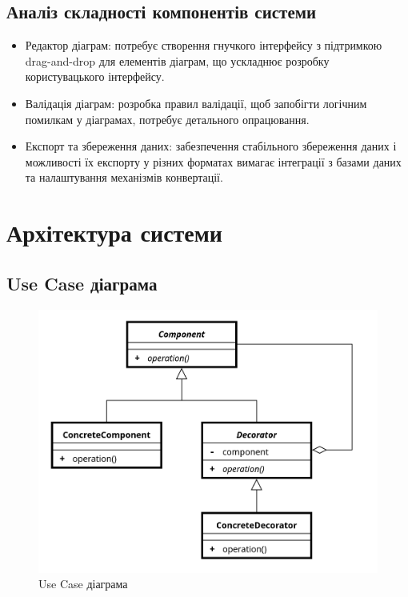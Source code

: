 \documentclass[oneside,14pt]{extarticle}
\begin{document}
\begin{normalsize}
	\subsection{Аналіз складності компонентів системи}
	\begin{itemize}
		\item Редактор діаграм: потребує створення гнучкого інтерфейсу з підтримкою drag-and-drop для елементів діаграм, що ускладнює розробку користувацького інтерфейсу.
		\item Валідація діаграм: розробка правил валідації, щоб запобігти логічним помилкам у діаграмах, потребує детального опрацювання.
		\item Експорт та збереження даних: забезпечення стабільного збереження даних і можливості їх експорту у різних форматах вимагає інтеграції з базами даних та налаштування механізмів конвертації.
	\end{itemize}
	
	\section{Архітектура системи}
	
	\subsection{Use Case діаграма}
	\begin{figure}[H]
		\centering
		\includegraphics[width=\columnwidth]{1}
		\caption{Use Case діаграма}
	\end{figure}
	

\end{normalsize}
\end{document}
